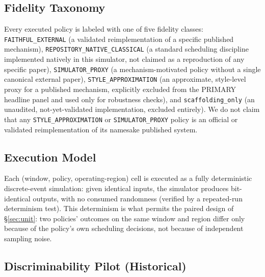 \subsection{Fidelity Taxonomy}
\label{sec:fidelity}

Every executed policy is labeled with one of five fidelity classes:
\texttt{FAITHFUL\_EXTERNAL} (a validated reimplementation of a specific
published mechanism), \texttt{REPOSITORY\_NATIVE\_CLASSICAL} (a standard
scheduling discipline implemented natively in this simulator, not claimed
as a reproduction of any specific paper), \texttt{SIMULATOR\_PROXY} (a
mechanism-motivated policy without a single canonical external paper),
\texttt{STYLE\_APPROXIMATION} (an approximate, style-level proxy for a
published mechanism, explicitly excluded from the PRIMARY headline panel
and used only for robustness checks), and \texttt{scaffolding\_only} (an
unaudited, not-yet-validated implementation, excluded entirely). We do not
claim that any \texttt{STYLE\_APPROXIMATION} or \texttt{SIMULATOR\_PROXY}
policy is an official or validated reimplementation of its namesake
published system.

\subsection{Execution Model}
\label{sec:execution-model}

Each (window, policy, operating-region) cell is executed as a fully
deterministic discrete-event simulation: given identical inputs, the
simulator produces bit-identical outputs, with no consumed randomness
(verified by a repeated-run determinism test). This determinism is what
permits the paired design of \S\ref{sec:unit}: two policies' outcomes on
the same window and region differ only because of the policy's own
scheduling decisions, not because of independent sampling noise.

\subsection{Discriminability Pilot (Historical)}
\label{sec:stage0}

